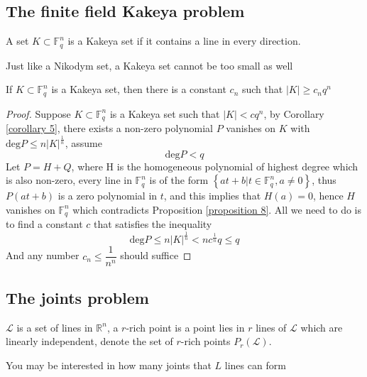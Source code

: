 \subsection{The finite field Kakeya problem}

\begin{definition}\label{definition 10}
A set $ K \subset \mathbb{F}_{q}^{n} $ is a Kakeya set if it contains a line in every direction.
\end{definition}

Just like a Nikodym set, a Kakeya set cannot be too small as well

\begin{theorem}\label{theorem 11}
If $ K \subset \mathbb{F}_{q}^{n} $ is a Kakeya set, then there is a constant $ c_{n} $ such that 
$ |K| \geq c_{n}q^{n} $
\end{theorem}

\begin{proof}
Suppose $ K \subset \mathbb{F}_{q}^{n} $ is a Kakeya set such that $ |K| < cq^{n} $, by Corollary \ref{corollary 5}, there exists a non-zero polynomial $ P $ vanishes on $ K $ with $ \mathrm{deg}P \leq n|K|^{\frac{1}{n}} $, assume
$$ \mathrm{deg}P < q $$
Let $ P = H + Q $, where H is the homogeneous polynomial of highest degree which is also non-zero, every line in $ \mathbb{F}_{q}^{n} $ is of the form $ \left\{at+b \Big| t \in \mathbb{F}_{q}^{n}, a \neq 0\right\} $, thus $ P(at+b) $ is a zero polynomial in $ t $, and this implies that $ H(a) = 0 $, hence $ H $ vanishes on 
$ \mathbb{F}_{q}^{n} $ which contradicts Proposition \ref{proposition 8}. All we need to do is to find a constant $ c $ that satisfies the inequality
$$ \mathrm{deg}P \leq n|K|^{\frac{1}{n}} < nc^{\frac{1}{n}}q \leq q $$
And any number $ c_{n} \leq \dfrac{1}{n^{n}} $ should suffice
\end{proof}

\subsection{The joints problem}

\begin{definition}\label{definition 12}
$ \mathscr{L} $ is a set of lines in $ \mathbb{R}^{n} $, a $r$-rich point is a point lies in $r$ lines of $ \mathscr{L} $ which are linearly independent, denote the set of $r$-rich points $ P_{r}(\mathscr{L}) $.
\end{definition}

You may be interested in how many joints that $ L $ lines can form

